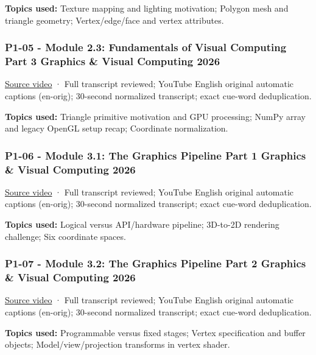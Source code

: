 \textbf{Topics used:} Texture mapping and lighting motivation; Polygon mesh and triangle geometry; Vertex/edge/face and vertex attributes.

\subsubsection{P1-05 - Module 2.3: Fundamentals of Visual Computing Part 3 Graphics \& Visual Computing 2026}\label{04-visual-computing-ii-ch036-p1-05---module-2.3-fundamentals-of-visual-computing-part-3-graphics-visual-computing-2026}

\href{https://www.youtube.com/watch?v=VPxqKOYjpG0}{Source video} · Full transcript reviewed; YouTube English original automatic captions (en-orig); 30-second normalized transcript; exact cue-word deduplication.

\textbf{Topics used:} Triangle primitive motivation and GPU processing; NumPy array and legacy OpenGL setup recap; Coordinate normalization.

\subsubsection{P1-06 - Module 3.1: The Graphics Pipeline Part 1 Graphics \& Visual Computing 2026}\label{04-visual-computing-ii-ch036-p1-06---module-3.1-the-graphics-pipeline-part-1-graphics-visual-computing-2026}

\href{https://www.youtube.com/watch?v=QEiWsz7cmnw}{Source video} · Full transcript reviewed; YouTube English original automatic captions (en-orig); 30-second normalized transcript; exact cue-word deduplication.

\textbf{Topics used:} Logical versus API/hardware pipeline; 3D-to-2D rendering challenge; Six coordinate spaces.

\subsubsection{P1-07 - Module 3.2: The Graphics Pipeline Part 2 Graphics \& Visual Computing 2026}\label{04-visual-computing-ii-ch036-p1-07---module-3.2-the-graphics-pipeline-part-2-graphics-visual-computing-2026}

\href{https://www.youtube.com/watch?v=rRQiFwFzFJM}{Source video} · Full transcript reviewed; YouTube English original automatic captions (en-orig); 30-second normalized transcript; exact cue-word deduplication.

\textbf{Topics used:} Programmable versus fixed stages; Vertex specification and buffer objects; Model/view/projection transforms in vertex shader.


